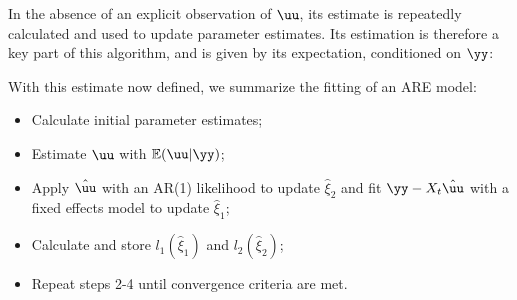 In the absence of an explicit observation of $\uu$, its estimate is repeatedly calculated and used to update parameter estimates. Its estimation is therefore a key part of this algorithm, and is given by its expectation, conditioned on $\yy$: 




With this estimate now defined, we summarize the fitting of an ARE model:








\begin{itemize}
    \item[1)] Calculate initial parameter estimates; 
    \item[2)] Estimate $\uu$ with $\mathbb{E}(\uu|\yy)$;
    \item[3)] Apply $\hat{\uu}$ with an AR(1) likelihood to update $\hat{\xi}_2$ and fit $\yy - X_t\hat{\uu}$ with a fixed effects model to update $\hat{\xi}_1$;
    \item[4)] Calculate and store $l_1(\hat{\xi}_1)$ and $l_2(\hat{\xi}_2)$;
    \item[5)] Repeat steps 2-4 until convergence criteria are met.
\end{itemize}


